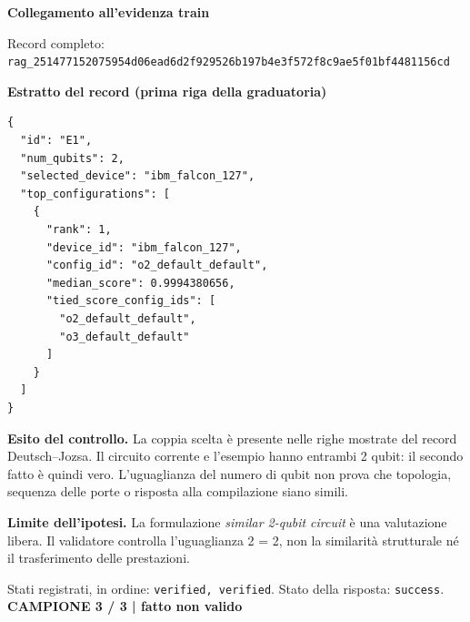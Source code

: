 \documentclass[a4paper,10pt]{article}
\newcommand{\tagline}[1]{{\small\color{ink}\textbf{#1}}\par}
\begin{document}
\textbf{Collegamento all'evidenza train}
\begin{center}\end{center}
{\footnotesize Record completo: \texttt{rag\_251477152075954d06ead6d2f929526b197b4e3f572f8c9ae5f01bf4481156cd}}\par
\textbf{Estratto del record (prima riga della graduatoria)}
\begin{lstlisting}
{
  "id": "E1",
  "num_qubits": 2,
  "selected_device": "ibm_falcon_127",
  "top_configurations": [
    {
      "rank": 1,
      "device_id": "ibm_falcon_127",
      "config_id": "o2_default_default",
      "median_score": 0.9994380656,
      "tied_score_config_ids": [
        "o2_default_default",
        "o3_default_default"
      ]
    }
  ]
}
\end{lstlisting}

\textbf{Esito del controllo.} La coppia scelta è presente nelle righe mostrate del record Deutsch--Jozsa. Il circuito corrente e l'esempio hanno entrambi 2 qubit: il secondo fatto è quindi vero. L'uguaglianza del numero di qubit non prova che topologia, sequenza delle porte o risposta alla compilazione siano simili.\par
{\color{warn}\textbf{Limite dell'ipotesi.}} La formulazione \emph{similar 2-qubit circuit} è una valutazione libera. Il validatore controlla l'uguaglianza 2 = 2, non la similarità strutturale né il trasferimento delle prestazioni.\par
{\small Stati registrati, in ordine: \texttt{verified, verified}. Stato della risposta: \texttt{success}.}
\newpage
\tagline{CAMPIONE 3 / 3 | fatto non valido}
\end{document}
